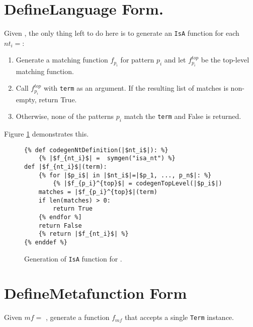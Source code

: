 \section{DefineLanguage Form.}
Given \DefineLanguage, the only thing left to do here is to generate an \texttt{IsA} function for each $nt_i=$\NtDefinition:
\begin{enumerate}
\item Generate a matching function $f_{p_i}$ for pattern $p_i$ and let $f_{p_i}^{top}$ be the top-level matching function.
\item Call $f_{p_i}^{top}$ with \texttt{term} as an argument. If the resulting list of matches is non-empty, return True.
\item Otherwise, none of the patterns $p_i$ match the \texttt{term} and False is returned.
\end{enumerate}

Figure \ref{codegen-ntdef} demonstrates this.

\begin{figure}
\begin{verbatim}
{% def codegenNtDefinition(|$nt_i$|): %}
	{% |$f_{nt_i}$| =  symgen("isa_nt") %}
def |$f_{nt_i}$|(term):
	{% for |$p_i$| in |$nt_i$|=|$p_1, ..., p_n$|: %}
		{% |$f_{p_i}^{top}$| = codegenTopLevel(|$p_i$|)
	matches = |$f_{p_i}^{top}$|(term)
	if len(matches) > 0:
		return True
	{% endfor %]
	return False
	{% return |$f_{nt_i}$| %}
{% enddef %}
\end{verbatim}
\caption{Generation of \texttt{IsA} function for \NtDefinitionNoArgs.}
\label{codegen-ntdef}
\end{figure}

\section{DefineMetafunction Form}

Given $mf=$ \DefineMetafunction, generate a function $f_{mf}$ that accepts a single \texttt{Term} instance.

